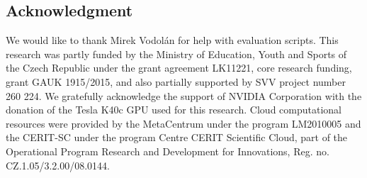 \documentclass{itatnew}
\def\PB#1{\textcolor{red}{PB: \textit{#1}}}
\begin{document}
\subsection*{Acknowledgment}
We would like to thank Mirek Vodolán for help with evaluation scripts.
This research was partly funded by the Ministry of Education, Youth and Sports of the Czech Republic under the grant agreement LK11221, core research funding, grant GAUK 1915/2015, and also partially supported by SVV project number 260 224. 
We gratefully acknowledge the support of NVIDIA Corporation with the donation of the Tesla K40c GPU used for this research.
Cloud computational resources were provided by the MetaCentrum under the program LM2010005 and the CERIT-SC under the program Centre CERIT Scientific Cloud, part of the Operational Program Research and Development for Innovations, Reg. no. CZ.1.05/3.2.00/08.0144.



\end{document}
